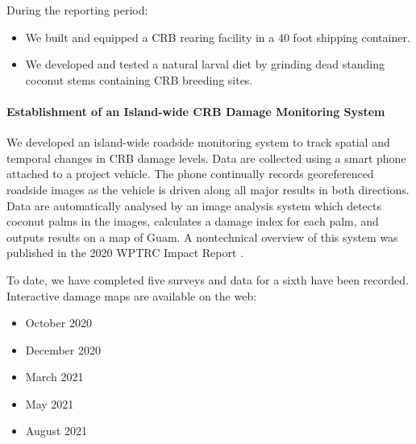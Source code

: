 \begin{refsection}
During the reporting period:
\begin{itemize}
	\item We built and equipped a CRB rearing facility in a 40 foot shipping container.  
	\item We developed and tested a natural larval diet by grinding dead standing coconut stems containing CRB breeding sites.
\end{itemize}

\paragraph{Establishment of an Island-wide CRB Damage Monitoring System}

We developed an island-wide roadside monitoring system to track spatial and temporal changes in CRB damage levels. Data are collected using a smart phone attached to a project vehicle. The phone continually records georeferenced roadside images as the vehicle is driven along all major results in both directions. Data are automatically analysed by an image analysis system which detects coconut palms in the images, calculates a damage index for each palm, and outputs results on a map of Guam. A nontechnical overview of this system was published in the 2020 WPTRC Impact Report \parencite{moore_using_2020-1}.

To date, we have completed five surveys and data for a sixth have been recorded. Interactive damage maps are available on the web: 
\begin{itemize}
	\item October 2020  \parencite{moore_crb_2020-1}
	\item December 2020 \parencite{moore_crb_2020}
	\item March 2021 \parencite{moore_crb_2021} 
	\item May 2021 \parencite{moore_crb_2021-1}
	\item August 2021 \parencite{moore_crb_2021-2}	
\end{itemize}


%
%


\end{refsection}
